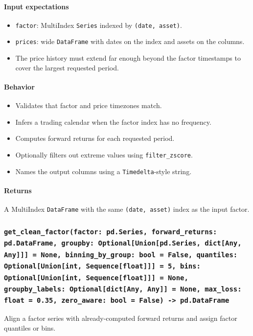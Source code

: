 \documentclass[11pt]{article}
\begin{document}
\paragraph{Input expectations}
\begin{itemize}
  \item \texttt{factor}: MultiIndex \texttt{Series} indexed by \texttt{(date, asset)}.
  \item \texttt{prices}: wide \texttt{DataFrame} with dates on the index and assets on the columns.
  \item The price history must extend far enough beyond the factor timestamps to cover the largest requested period.
\end{itemize}

\paragraph{Behavior}
\begin{itemize}
  \item Validates that factor and price timezones match.
  \item Infers a trading calendar when the factor index has no frequency.
  \item Computes forward returns for each requested period.
  \item Optionally filters out extreme values using \texttt{filter\_zscore}.
  \item Names the output columns using a \texttt{Timedelta}-style string.
\end{itemize}

\paragraph{Returns}
A MultiIndex \texttt{DataFrame} with the same \texttt{(date, asset)} index as the input factor.

\subsubsection{\texttt{get\_clean\_factor(factor: pd.Series, forward\_returns: pd.DataFrame, groupby: Optional[Union[pd.Series, dict[Any, Any]]] = None, binning\_by\_group: bool = False, quantiles: Optional[Union[int, Sequence[float]]] = 5, bins: Optional[Union[int, Sequence[float]]] = None, groupby\_labels: Optional[dict[Any, Any]] = None, max\_loss: float = 0.35, zero\_aware: bool = False) -> pd.DataFrame}}
Align a factor series with already-computed forward returns and assign factor quantiles or bins.
\end{document}
